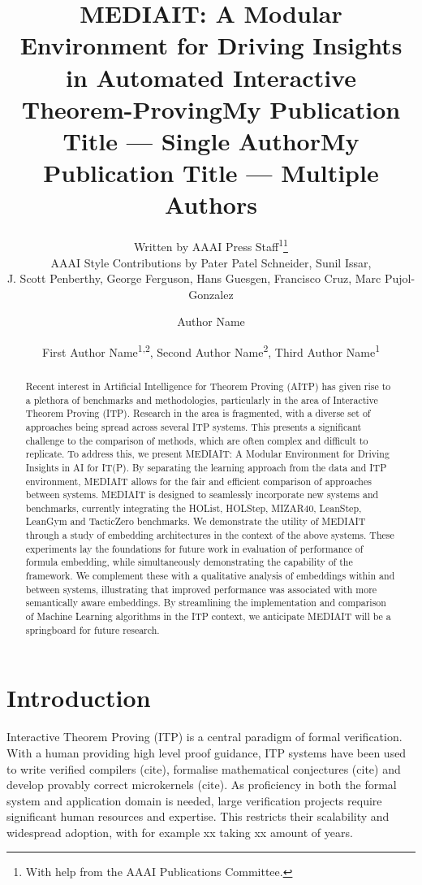 \documentclass[letterpaper]{article} %
\title{MEDIAIT: A Modular Environment for Driving Insights in Automated Interactive Theorem-Proving}
\author{
    Written by AAAI Press Staff\textsuperscript{\rm 1}\thanks{With help from the AAAI Publications Committee.}\\
    AAAI Style Contributions by Pater Patel Schneider,
    Sunil Issar,\\
    J. Scott Penberthy,
    George Ferguson,
    Hans Guesgen,
    Francisco Cruz\equalcontrib,
    Marc Pujol-Gonzalez\equalcontrib
}
\title{My Publication Title --- Single Author}
\author {
    Author Name
}
\title{My Publication Title --- Multiple Authors}
\author {
    First Author Name\textsuperscript{\rm 1,\rm 2},
    Second Author Name\textsuperscript{\rm 2},
    Third Author Name\textsuperscript{\rm 1}
}
\begin{document}
    \maketitle

    \begin{abstract}
        Recent interest in Artificial Intelligence for Theorem Proving (AITP) has given rise to a plethora of benchmarks and
        methodologies, particularly in the area of Interactive Theorem Proving (ITP).
        Research in the area is fragmented, with a diverse set of approaches being spread across several ITP systems.
        This presents a significant challenge to the comparison of methods, which are often complex and difficult to replicate.
        To address this, we present MEDIAIT: A Modular Environment for Driving Insights in AI for IT(P).
        By separating the learning approach from the data and ITP environment, MEDIAIT allows for the fair and efficient
        comparison of approaches between systems.
        MEDIAIT is designed to seamlessly incorporate new systems and benchmarks, currently integrating the HOList, HOLStep,
        MIZAR40, LeanStep, LeanGym and TacticZero benchmarks.
        We demonstrate the utility of MEDIAIT through a study of embedding architectures in the context of the above systems.
        These experiments lay the foundations for future work in evaluation of performance of formula embedding,
        while simultaneously demonstrating the capability of the framework.
        We complement these with a qualitative analysis of embeddings within and between systems, illustrating that improved
        performance was associated with more semantically aware embeddings.
        By streamlining the implementation and comparison of Machine Learning algorithms in the ITP context,
        we anticipate MEDIAIT will be a springboard for future
        research.

    \end{abstract}


    \section{Introduction}

    Interactive Theorem Proving (ITP) is a central paradigm of formal verification.
    With a human providing high level proof guidance, ITP systems have been used to write verified compilers (cite),
    formalise mathematical conjectures (cite) and develop provably correct microkernels (cite).
    As proficiency in both the formal system and application domain is needed,
    large verification projects require significant human resources and expertise.
    This restricts their scalability and widespread adoption, with for example xx taking xx amount of years.
\end{document}
